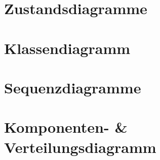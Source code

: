 \documentclass[DIV=13, 10pt,a4paper]{scrartcl}
\begin{document}
\pagebreak

\section{Zustandsdiagramme}


\pagebreak

\section{Klassendiagramm}


\pagebreak

\section{Sequenzdiagramme}


\pagebreak

\section{Komponenten- \& Verteilungsdiagramm}




\pagebreak
\renewcommand{\appendixtocname}{Appendix}
\renewcommand{\appendixpagename}{Appendix}
\begin{appendices}
	\makeatletter
	{
		\begingroup
		\let\protect\l@chapter\protect\l@section
		\let\protect\l@section\protect\l@subsection
	}

	
	
	\pagebreak
	
	
	
	\pagebreak

	
	
\end{appendices}
\end{document}
